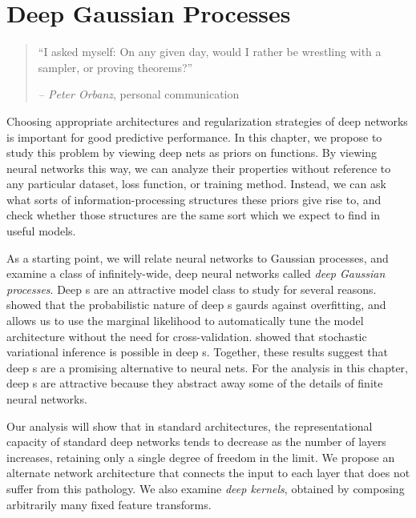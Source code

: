 
\inbpdocument


\chapter{Deep Gaussian Processes}
\label{ch:deep-limits}

\begin{quotation}
``I asked myself: On any given day, would I rather be wrestling with a sampler, or proving theorems?''

\hspace*{\fill} \emph{ -- Peter Orbanz}, personal communication
\end{quotation}




Choosing appropriate architectures and regularization strategies of deep networks is important for good predictive performance.
In this chapter, we propose to study this problem by viewing deep nets as priors on functions.
By viewing neural networks this way, we can analyze their properties without reference to any particular dataset, loss function, or training method.
Instead, we can ask what sorts of information-processing structures these priors give rise to, and check whether those structures are the same sort which we expect to find in useful models.

As a starting point, we will relate neural networks to Gaussian processes, and examine a class of infinitely-wide, deep neural networks called \emph{deep Gaussian processes}.
Deep \gp{}s are an attractive model class to study for several reasons.
\citet{damianou2012deep} showed that the probabilistic nature of deep \gp{}s gaurds against overfitting, and allows us to use the marginal likelihood to automatically tune the model architecture without the need for cross-validation.
\citet{hensman2014deep} showed that stochastic variational inference is possible in deep \gp{}s.
Together, these results suggest that deep \gp{}s are a promising alternative to neural nets.
For the analysis in this chapter, deep \gp{}s are attractive because they abstract away some of the details of finite neural networks. %

Our analysis will show that in standard architectures, the representational capacity of standard deep networks tends to decrease as the number of layers increases, retaining only a single degree of freedom in the limit.
We propose an alternate network architecture that connects the input to each layer that does not suffer from this pathology.
We also examine \emph{deep kernels}, obtained by composing arbitrarily many fixed feature transforms.

